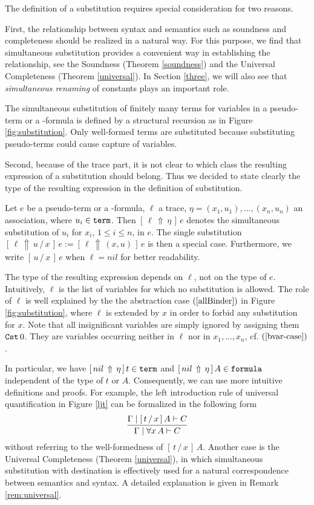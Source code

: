 \documentclass{svjour3}                     %
\newcommand{\seq}[2]{\infer{#2}{#1}}
\newcommand{\Ga}{\Gamma}
\newcommand{\vd}{\vdash}
\newcommand{\substa}[3]{[\,#3\, \Uparrow\, #2\,]\, #1}
\newcommand{\subst}[4]{[\, #4\, \Uparrow\,  #3\, \slash\, #2\,]\, #1}
\newcommand{\substs}[3]{[\, #3\, \slash\, #2\,]\, #1}
\newcommand{\tCst}{\textup{\tt Cst}}
\newcommand{\tterm}{\textup{\tt term}}
\newcommand{\tfml}{\textup{\tt formula}}
\begin{document}
The definition of a substitution requires special consideration for two reasons.

First, the relationship between syntax and semantics such as soundness and completeness should be realized in a natural way. 
For this purpose, we find that simultaneous substitution provides a convenient way in establishing the relationship, see the Soundness (Theorem \ref{soundness}) and the Universal Completeness (Theorem \ref{universal}). In Section \ref{three}, we will also see that \textit{simultaneous renaming} of constants plays an important role.

The simultaneous substitution of finitely many terms for variables in a pseudo-term or a -formula is defined by a structural recursion as in Figure \ref{fig:substitution}. Only well-formed terms are substituted because substituting pseudo-terms could cause capture of variables.

Second, because of the trace part, it is not clear to which class the resulting expression of a substitution should belong. Thus we decided to state clearly the type of the resulting expression in the definition of substitution.

Let $e$ be a pseudo-term or a -formula, $\ell$ a trace, $\eta = (x_1, u_1), ..., (x_n,u_n)$ an association, where
$u_i\in \tterm$.
Then $\substa{e}{\eta}{\ell}$ denotes the simultaneous substitution of $u_i$ for $x_i$, $1 \le i \le n$, in $e$.
The single substitution $\subst{e}{x}{u}{\ell} := \substa{e}{(x,u)}{\ell}$ is then a special case. Furthermore, we write $\substs{e}{x}{u}$ when $\ell = nil$ for better readability.

The type of the resulting expression depends on $\ell$, not on the type of $e$. Intuitively, $\ell$ is the list of variables for which no substitution is allowed. The role of $\ell$ is well explained by the the abstraction case $(\ref{allBinder})$ in Figure \ref{fig:substitution}, where $\ell$ is extended by $x$ in order to forbid any substitution for $x$.
Note that all insignificant variables are simply ignored by assigning them $\tCst\, 0$. They are variables occurring neither in $\ell$ nor in $x_1, ..., x_n$, cf. $(\ref{bvar-case})$.

In particular, we have $\substa{t}{\eta}{nil} \in \tterm$ and $\substa{A}{\eta}{nil} \in \tfml$ independent of the type of $t$ or $A$. Consequently, we can use more intuitive definitions and proofs. For example, the left introduction rule of universal quantification in Figure \ref{ljt} can be formalized in the following form
\[
\seq{\Ga\mid \substs{A}{x}{t} \vd C}{\Ga\mid \forall x\, A \vd C}
\]
without referring to the well-formedness of $\substs{A}{x}{t}$. 
Another case is the Universal Completeness (Theorem \ref{universal}), in which simultaneous substitution with destination is effectively used for a natural correspondence between semantics and syntax. A detailed explanation is given in Remark \ref{rem:universal}.
\end{document}
